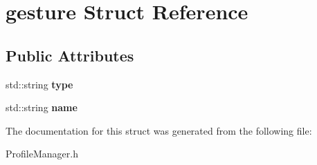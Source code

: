 \hypertarget{structgesture}{\section{gesture Struct Reference}
\label{structgesture}
}
\subsection*{Public Attributes}
\begin{DoxyCompactItemize}
\item 
\hypertarget{structgesture_a604f792a5de91022f8343cff070192e5}{std\+::string {\bfseries type}}\label{structgesture_a604f792a5de91022f8343cff070192e5}

\item 
\hypertarget{structgesture_ac480b72b8e4be618a15caade626c130d}{std\+::string {\bfseries name}}\label{structgesture_ac480b72b8e4be618a15caade626c130d}

\end{DoxyCompactItemize}


The documentation for this struct was generated from the following file\+:\begin{DoxyCompactItemize}
\item 
Profile\+Manager.\+h\end{DoxyCompactItemize}
